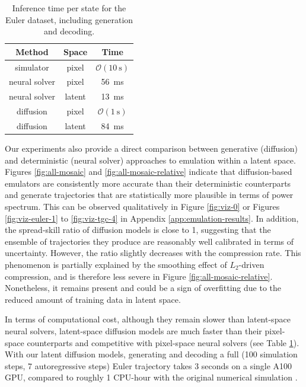 \begin{table}
    \centering
    \caption{Inference time per state for the Euler dataset, including generation and decoding.}
    \small
    \begin{tabular}{ccc}
        \toprule
        Method & Space & Time \\
        \midrule
        simulator & pixel & $\mathcal{O}(\qty{10}{\second})$ \\
        neural solver & pixel & \qty{56}{\milli\second} \\
        neural solver & latent & \qty{13}{\milli\second} \\
        diffusion & pixel & $\mathcal{O}(\qty{1}{\second})$ \\
        diffusion & latent & \qty{84}{\milli\second} \\
        \bottomrule
    \end{tabular}
    \label{tab:inference-time}
\end{table}

Our experiments also provide a direct comparison between generative (diffusion) and deterministic (neural solver) approaches to emulation within a latent space. Figures \ref{fig:all-mosaic} and \ref{fig:all-mosaic-relative} indicate that diffusion-based emulators are consistently more accurate than their deterministic counterparts and generate trajectories that are statistically more plausible in terms of power spectrum. This can be observed qualitatively in Figure \ref{fig:viz-0} or Figures \ref{fig:viz-euler-1} to \ref{fig:viz-tgc-4} in Appendix \ref{app:emulation-results}. In addition, the spread-skill ratio of diffusion models is close to 1, suggesting that the ensemble of trajectories they produce are reasonably well calibrated in terms of uncertainty. However, the ratio slightly decreases with the compression rate. This phenomenon is partially explained by the smoothing effect of $L_2$-driven compression, and is therefore less severe in Figure \ref{fig:all-mosaic-relative}. Nonetheless, it remains present and could be a sign of overfitting due to the reduced amount of training data in latent space.

In terms of computational cost, although they remain slower than latent-space neural solvers, latent-space diffusion models are much faster than their pixel-space counterparts and competitive with pixel-space neural solvers (see Table \ref{tab:inference-time}). With our latent diffusion models, generating and decoding a full (100 simulation steps, 7 autoregressive steps) Euler trajectory takes 3 seconds on a single A100 GPU, compared to roughly 1 CPU-hour with the original numerical simulation \cite{mandli2016clawpack, ohana2024well}.

